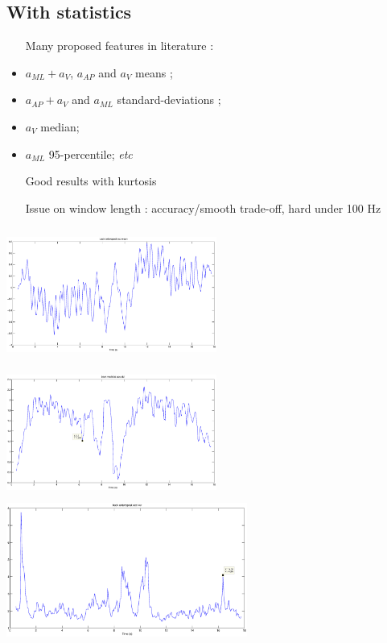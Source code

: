\documentclass{beamer}
\begin{document}
\subsection{With statistics}
\begin{frame}
\begin{itemize}
\item[Many] proposed features in literature :
\item $a_{ML}+a_V$, $a_{AP}$ and $a_V$ means ;
\item $a_{AP}+a_V$ and $a_{ML}$ standard-deviations ;
\item $a_V$ median;
\item $a_{ML}$ 95-percentile; \emph{etc}

\item[Good] results with kurtosis
\item[Issue] on window length : accuracy/smooth trade-off, hard under 100 Hz
\end{itemize}
\end{frame}

\begin{frame}
\hspace*{-2cm}\includegraphics[height=4.4cm,width=6.9cm]{examplew16moyAap}\includegraphics[height=4.4cm,width=6.9cm]{examplew16stdAml}
\\\includegraphics[height=4.4cm]{examplew16kurAap}
\end{frame}
\end{document}
